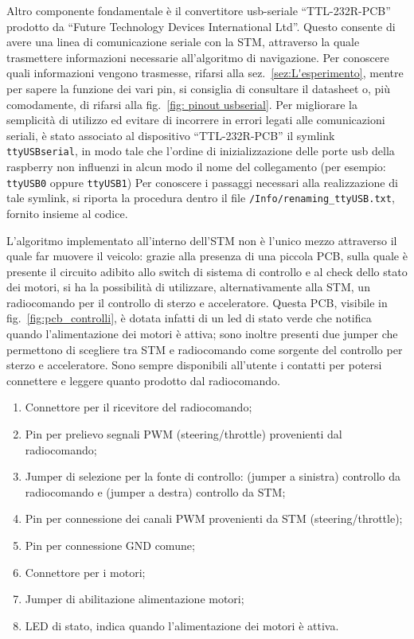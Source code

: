 Altro componente fondamentale è il convertitore usb-seriale ``TTL-232R-PCB'' prodotto da 
``Future Technology Devices International Ltd''. 
Questo consente di avere una linea di comunicazione seriale con la STM, attraverso la quale trasmettere informazioni necessarie all'algoritmo di navigazione.
Per conoscere quali informazioni vengono trasmesse, rifarsi alla sez.~\ref{sez:L'esperimento}, mentre per sapere la funzione dei vari pin, si consiglia di consultare il datasheet o, più comodamente, di rifarsi alla fig.~\ref{fig: pinout usbserial}. 
Per migliorare la semplicità di utilizzo ed evitare di incorrere in errori legati alle comunicazioni seriali, è stato associato al dispositivo ``TTL-232R-PCB'' il symlink \texttt{ttyUSBserial}, in modo tale che l’ordine di inizializzazione delle porte usb della raspberry non influenzi in alcun modo il nome del collegamento (per esempio: \texttt{ttyUSB0} oppure  \texttt{ttyUSB1})
Per conoscere i passaggi necessari alla realizzazione di tale symlink, si riporta la procedura dentro il file \texttt{/Info/renaming\_ttyUSB.txt}, fornito insieme al codice.


L'algoritmo implementato all'interno dell'STM non è l'unico mezzo attraverso il quale far muovere il veicolo: grazie alla presenza di una piccola PCB, sulla quale è presente il circuito adibito allo switch di sistema di controllo e al check dello stato dei motori, si ha la possibilità di utilizzare, alternativamente alla STM, un radiocomando per il controllo di sterzo e acceleratore.
Questa PCB, visibile in fig.~\ref{fig:pcb_controlli}, è dotata infatti di un led di stato verde che notifica quando l’alimentazione dei motori è attiva; sono inoltre presenti due jumper che permettono di scegliere tra STM e radiocomando come sorgente del controllo per sterzo e acceleratore. 
Sono sempre disponibili all’utente i contatti per potersi connettere e leggere quanto prodotto dal radiocomando.

\begin{enumerate}
    \item Connettore per il ricevitore del radiocomando;
    \item Pin per prelievo segnali PWM (steering/throttle) provenienti dal radiocomando;
    \item Jumper di selezione per la fonte di controllo: (jumper a sinistra) controllo da radiocomando e (jumper a destra) controllo da STM;
	\item Pin per connessione dei canali PWM provenienti da STM (steering/throttle);
    \item Pin per connessione GND comune;
    \item Connettore per i motori;
    \item Jumper di abilitazione alimentazione motori;
    \item LED di stato, indica quando l'alimentazione dei motori è attiva.
\end{enumerate}

